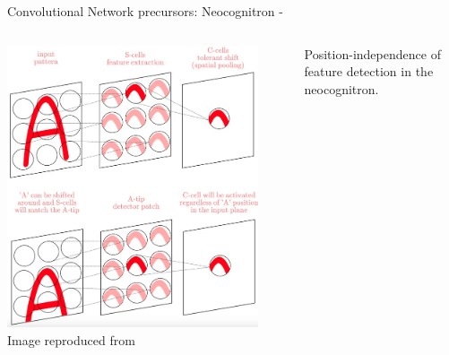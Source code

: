 \begin{frame}[t,allowframebreaks]{Convolutional Network precursors: Neocognitron -}
    \begin{columns}
        \begin{column}{0.55\textwidth}
            \begin{center}
                \includegraphics[width=0.90\textwidth]
                   {./images/neocognitron/elhamraoui20_feature_detection_schematic.png}\\
                {\scriptsize 
                \color{col:attribution} 
                Image reproduced from \cite{Medium:LeNet5andAlexNet}}\\
            \end{center}
        \end{column}
        \begin{column}{0.45\textwidth}
            \begin{center}
                Position-independence of feature detection in the \gls{neocognitron}.\\
            \end{center}
        \end{column}
    \end{columns}

\end{frame}


